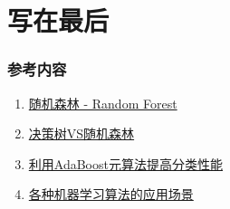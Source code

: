 \documentclass[aspectratio=43, 12pt, utf8, mathserif]{ctexbeamer} %
\begin{document}
\section{写在最后}
\begin{frame}
    \frametitle{参考内容}
    \begin{enumerate}
        \item \href{https://zhuanlan.zhihu.com/p/44695084}{随机森林 - Random Forest}
        \item \href{https://www.jiqizhixin.com/articles/2020-06-11-6}{决策树VS随机森林}
        \item \href{https://blog.csdn.net/baidu_31657889/article/details/93891552?utm_source=app&app_version=4.7.1}{利用AdaBoost元算法提高分类性能}
        \item \href{https://www.zhihu.com/question/26726794/answer/151282052}{各种机器学习算法的应用场景}
    \end{enumerate}
\end{frame}

\begin{frame}
\end{frame}
\end{document}
